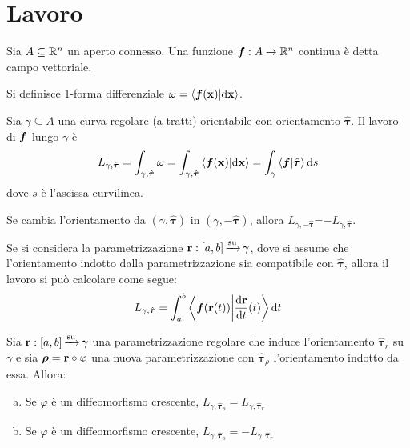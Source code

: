 \section{Lavoro}

\begin{definition}
	Sia $A\subseteq \mathbb{R}^n$ un aperto connesso. Una funzione $\bm f: A \to \mathbb{R}^n$ continua è detta campo vettoriale.
\end{definition}

\begin{definition}
	\label{def:1form}
	Si definisce 1-forma differenziale $\omega=\ip{\vecf(\vb{x})}{\dd \vb{x}}$.
\end{definition}

\begin{definition}
	[Lavoro]
	Sia $\gamma \subseteq A$ una curva regolare (a tratti) orientabile con orientamento $\hat{\bm\tau}$. Il lavoro di $\bm f$ lungo $\gamma$ è
	$$
		L_{\gamma,\hat{\bm\tau}}=\int_{\gamma,\hat{\bm\tau}}\omega=\int_{\gamma, \hat{\bm\tau}}\ip{\vecf(\vb{x})}{\dd \vb{x}}=\int_\gamma \ip{\vecf}{\hat{\bm\tau}}\dd s
	$$
	dove $s$ è l'ascissa curvilinea.
\end{definition}

\begin{remark}
	Se cambia l'orientamento da $(\gamma, \hat{\bm\tau})$ in $(\gamma, -\hat{\bm\tau})$, allora $L_{\gamma,-\hat{\bm\tau}}$=$-L_{\gamma,\hat{\bm\tau}}$.
\end{remark}

Se si considera la parametrizzazione $\vb{r}: [a,b]\operatorname{\xrightarrow{\operatorname{su}}} \gamma$, dove si assume che l'orientamento indotto dalla parametrizzazione sia compatibile con $\hat{\bm\tau}$, allora il lavoro si può calcolare come segue:
$$
	L_{\gamma, \hat{\bm\tau}} = \int_a^b\ip{\vecf(\vb{r} (t))}{\frac{\dd \vb{r}}{\dd t} (t)}\dd t
$$

\begin{theorem}
	Sia $\vb{r}:[a,b]\operatorname{\xrightarrow{\operatorname{su}}} \gamma$ una parametrizzazione regolare che induce l'orientamento $\hat{\bm\tau}_r$ su $\gamma$ e sia $\bm\rho = \vb{r} \circ \varphi$ una nuova parametrizzazione con $\hat{\bm\tau}_\rho$ l'orientamento indotto da essa. Allora:
	\begin{enumerate} [a.]
		\item Se $\varphi$ è un diffeomorfismo crescente, $L_{\gamma, \hat{\bm\tau}_\rho} = L_{\gamma, \hat{\bm\tau}_r}$
		\item Se $\varphi$ è un diffeomorfismo crescente, $L_{\gamma, \hat{\bm\tau}_\rho} = -L_{\gamma, \hat{\bm\tau}_r}$
	\end{enumerate}
\end{theorem}

